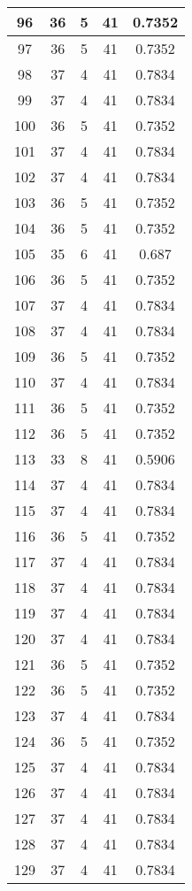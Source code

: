 \documentclass[letterpaper, 12pt]{article}
\begin{document}
\begin{longtable}{|c|c|c|c|c|}
\hline
96 & 36 & 5 & 41 & 0.7352 \\
\hline
97 & 36 & 5 & 41 & 0.7352 \\
\hline
98 & 37 & 4 & 41 & 0.7834 \\
\hline
99 & 37 & 4 & 41 & 0.7834 \\
\hline
100 & 36 & 5 & 41 & 0.7352 \\
\hline
101 & 37 & 4 & 41 & 0.7834 \\
\hline
102 & 37 & 4 & 41 & 0.7834 \\
\hline
103 & 36 & 5 & 41 & 0.7352 \\
\hline
104 & 36 & 5 & 41 & 0.7352 \\
\hline
105 & 35 & 6 & 41 & 0.687 \\
\hline
106 & 36 & 5 & 41 & 0.7352 \\
\hline
107 & 37 & 4 & 41 & 0.7834 \\
\hline
108 & 37 & 4 & 41 & 0.7834 \\
\hline
109 & 36 & 5 & 41 & 0.7352 \\
\hline
110 & 37 & 4 & 41 & 0.7834 \\
\hline
111 & 36 & 5 & 41 & 0.7352 \\
\hline
112 & 36 & 5 & 41 & 0.7352 \\
\hline
113 & 33 & 8 & 41 & 0.5906 \\
\hline
114 & 37 & 4 & 41 & 0.7834 \\
\hline
115 & 37 & 4 & 41 & 0.7834 \\
\hline
116 & 36 & 5 & 41 & 0.7352 \\
\hline
117 & 37 & 4 & 41 & 0.7834 \\
\hline
118 & 37 & 4 & 41 & 0.7834 \\
\hline
119 & 37 & 4 & 41 & 0.7834 \\
\hline
120 & 37 & 4 & 41 & 0.7834 \\
\hline
121 & 36 & 5 & 41 & 0.7352 \\
\hline
122 & 36 & 5 & 41 & 0.7352 \\
\hline
123 & 37 & 4 & 41 & 0.7834 \\
\hline
124 & 36 & 5 & 41 & 0.7352 \\
\hline
125 & 37 & 4 & 41 & 0.7834 \\
\hline
126 & 37 & 4 & 41 & 0.7834 \\
\hline
127 & 37 & 4 & 41 & 0.7834 \\
\hline
128 & 37 & 4 & 41 & 0.7834 \\
\hline
129 & 37 & 4 & 41 & 0.7834 \\

\end{longtable}
\end{document}
